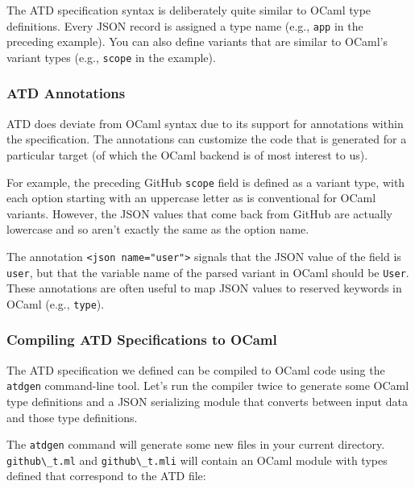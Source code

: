The ATD specification syntax is deliberately quite similar to OCaml type
definitions. Every JSON record is assigned a type name (e.g.,
\passthrough{\lstinline!app!} in the preceding example). You can also
define variants that are similar to OCaml's variant types (e.g.,
\passthrough{\lstinline!scope!} in the example).

\hypertarget{atd-annotations}{%
\subsubsection{ATD Annotations}\label{atd-annotations}}

ATD does deviate from OCaml syntax due to its support for annotations
within the specification. The annotations can customize the code that is
generated for a particular target (of which the OCaml backend is of most
interest to us). 

For example, the preceding GitHub \passthrough{\lstinline!scope!} field
is defined as a variant type, with each option starting with an
uppercase letter as is conventional for OCaml variants. However, the
JSON values that come back from GitHub are actually lowercase and so
aren't exactly the same as the option name.

The annotation \passthrough{\lstinline!<json name="user">!} signals that
the JSON value of the field is \passthrough{\lstinline!user!}, but that
the variable name of the parsed variant in OCaml should be
\passthrough{\lstinline!User!}. These annotations are often useful to
map JSON values to reserved keywords in OCaml (e.g.,
\passthrough{\lstinline!type!}).

\hypertarget{compiling-atd-specifications-to-ocaml}{%
\subsubsection{Compiling ATD Specifications to
OCaml}\label{compiling-atd-specifications-to-ocaml}}

The ATD specification we defined can be compiled to OCaml code using the
\passthrough{\lstinline!atdgen!} command-line tool. Let's run the
compiler twice to generate some OCaml type definitions and a JSON
serializing module that converts between input data and those type
definitions. 

The \passthrough{\lstinline!atdgen!} command will generate some new
files in your current directory. \passthrough{\lstinline!github\_t.ml!}
and \passthrough{\lstinline!github\_t.mli!} will contain an OCaml module
with types defined that correspond to the ATD file:


